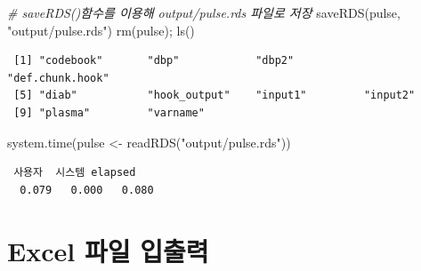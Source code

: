 \documentclass[
  11pt,
]{krantz}
\newenvironment{Shaded}{\begin{snugshade}}{\end{snugshade}}
\newcommand{\CommentTok}[1]{\textcolor[rgb]{0.37,0.37,0.37}{\textit{#1}}}
\newcommand{\FunctionTok}[1]{\textcolor[rgb]{0,0,0}{#1}}
\newcommand{\NormalTok}[1]{#1}
\newcommand{\OtherTok}[1]{\textcolor[rgb]{0.37,0.37,0.37}{#1}}
\newcommand{\StringTok}[1]{\textcolor[rgb]{0.5,0.5,0.5}{#1}}
\begin{document}
\begin{Shaded}
\begin{Highlighting}[]
\CommentTok{\# saveRDS()함수를 이용해 output/pulse.rds 파일로 저장}
\FunctionTok{saveRDS}\NormalTok{(pulse, }\StringTok{"output/pulse.rds"}\NormalTok{)}
\FunctionTok{rm}\NormalTok{(pulse); }\FunctionTok{ls}\NormalTok{()}
\end{Highlighting}
\end{Shaded}

\begin{verbatim}
 [1] "codebook"       "dbp"            "dbp2"           "def.chunk.hook"
 [5] "diab"           "hook_output"    "input1"         "input2"        
 [9] "plasma"         "varname"       
\end{verbatim}

\begin{Shaded}
\begin{Highlighting}[]
\FunctionTok{system.time}\NormalTok{(pulse }\OtherTok{\textless{}{-}} \FunctionTok{readRDS}\NormalTok{(}\StringTok{"output/pulse.rds"}\NormalTok{))}
\end{Highlighting}
\end{Shaded}

\begin{verbatim}
 사용자  시스템 elapsed 
  0.079   0.000   0.080 
\end{verbatim}

\normalsize

\hypertarget{import-export-excel}{%
\section{Excel 파일 입출력}\label{import-export-excel}}
\end{document}
